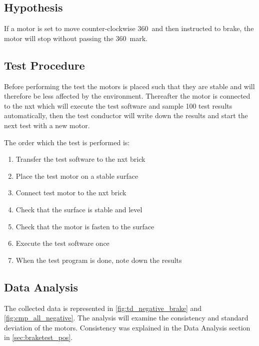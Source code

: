 \subsection{Hypothesis} 
If a motor is set to move counter-clockwise 360\degree\ and then instructed to brake, the motor will stop without passing the 360\degree\ mark.

\subsection{Test Procedure}
Before performing the test the motors is placed such that they are stable and will therefore be less affected by the environment. Thereafter the motor is connected to the \gls{nxt} which will execute the test software and sample 100 test results automatically, then the test conductor will write down the results and start the next test with a new motor.

The order which the test is performed is:
\begin{enumerate}
  \item Transfer the test software to the \gls{nxt} brick
  \item Place the test motor on a stable surface
  \item Connect test motor to the \gls{nxt} brick
  \item Check that the surface is stable and level
  \item Check that the motor is fasten to the surface
  \item Execute the test software once
  \item When the test program is done, note down the results
\end{enumerate}

\subsection{Data Analysis}
The collected data is represented in \cref{fig:td_negative_brake} and \cref{fig:cmp_all_negative}. The analysis will examine the consistency and standard deviation of the motors. Consistency was explained in the Data Analysis section in \cref{sec:braketest_pos}.

